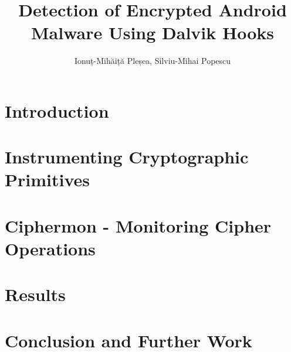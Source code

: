 \documentclass{llncs}
\begin{document}
\title{Detection of Encrypted Android Malware Using Dalvik Hooks}


\author{Ionuț-Mihăiță Pleșea, Silviu-Mihai Popescu}

\maketitle


\begin{abstract}
  
\end{abstract}



\section{Introduction}
\label{sec:intro}


\section{Instrumenting Cryptographic Primitives}
\label{sec:design}


\section{Ciphermon - Monitoring Cipher Operations}
\label{sec:implementation}


\section{Results}
\label{sec:results}


\section{Conclusion and Further Work}
\label{sec:conclusion}


\vspace*{3\baselineskip}



\end{document}
